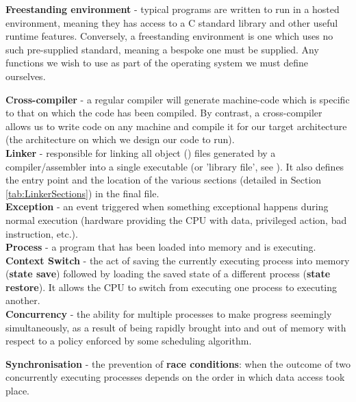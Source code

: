     \noindent \textbf{Freestanding environment} - typical programs are written
    to run in a hosted environment, meaning they has access to a C standard
    library and other useful runtime features. Conversely, a freestanding
    environment is one which uses no such pre-supplied standard, meaning a
    bespoke one must be supplied. Any functions we wish to use as part of the
    operating system we must define ourselves.

    \noindent \textbf{Cross-compiler} - a regular compiler will generate
    machine-code which is specific to that on which the code has been compiled.
    By contrast, a  cross-compiler allows us to write code on any machine and
    compile it for our target architecture (the architecture on which we design
    our code to run). \\

    \noindent \textbf{Linker} - responsible for linking all object ()
    files generated by a compiler/assembler into a single executable (or
    'library file', see \cite{StaticLibrary}). It also defines the entry point
    and the location of the various sections (detailed in Section
    \ref{tab:LinkerSections}) in the final  file.\\

    \noindent \textbf{Exception} - an event triggered when something exceptional happens
    during normal execution (hardware providing the CPU with data, privileged
    action, bad instruction, etc.). \\

    \noindent \textbf{Process} - a program that has been loaded into memory and is
    executing. \\

    \noindent \textbf{Context Switch} - the act of saving the currently executing process
    into memory (\textbf{state save}) followed by loading the saved state of a
    different process (\textbf{state restore}). It allows the CPU to switch from
    executing one process to executing another. \\

    \noindent \textbf{Concurrency} - the ability for multiple processes to make
    progress seemingly simultaneously, as a result of being rapidly brought into
    and out of memory with respect to a policy enforced by some scheduling
    algorithm.

    \noindent \textbf{Synchronisation} - the prevention of \textbf{race
    conditions}: when the outcome of two concurrently executing processes
    depends on the order in which data access took place. \\

